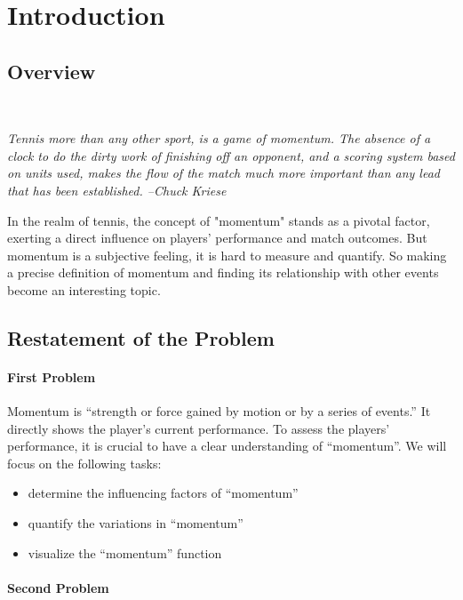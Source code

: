 \setcounter{page}{1}

\section{Introduction}

\subsection{Overview}~{}

\textit{Tennis more than any other sport, is a game of momentum. 
The absence of a clock to do the dirty work of finishing off an opponent, 
and a scoring system based on units used, makes the flow of the match much more important than any 
lead that has been established.   \quad--Chuck Kriese}

In the realm of tennis, the concept of "momentum" stands as a pivotal factor, 
exerting a direct influence on players' performance and match outcomes. But momentum
is a subjective feeling, it is hard to measure and quantify. So making a precise definition 
of momentum and finding its relationship with other events become an interesting topic.

\subsection{Restatement of the Problem}

\paragraph{First Problem}

Momentum is “strength or force gained by motion or by a series of 
events.” It directly shows the player's current performance.
To assess the players' performance, it is crucial to have a clear understanding of ``momentum''. 
We will focus on the following tasks: 
\begin{itemize}
    \item determine the influencing factors of ``momentum''
    \item quantify the variations in ``momentum''
    \item visualize the ``momentum'' function
\end{itemize}

\paragraph{Second Problem}

